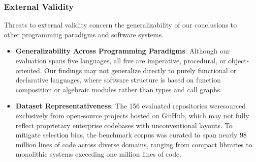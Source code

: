 \subsubsection{External Validity}
\label{subsec:external_validity}

Threats to external validity concern the generalizability of our conclusions to
other programming paradigms and software systems.

\begin{itemize}[leftmargin=2.5em]
  \item \textbf{Generalizability Across Programming Paradigms}:
    Although our evaluation spans five languages, all five are imperative,
    procedural, or object-oriented. Our findings may not generalize directly to
    purely functional or declarative languages, where software structure is
    based on function composition or algebraic modules rather than types and
    call graphs.

  \item \textbf{Dataset Representativeness}:
    The 156 evaluated repositories were\linebreak sourced exclusively
    from open-source
    projects hosted on GitHub, which may not fully reflect proprietary
    enterprise codebases with unconventional layouts. To mitigate selection
    bias, the benchmark corpus was curated to span nearly 98 million lines of
    code across diverse domains, ranging from compact libraries to monolithic
    systems exceeding one million lines of code.
\end{itemize}
